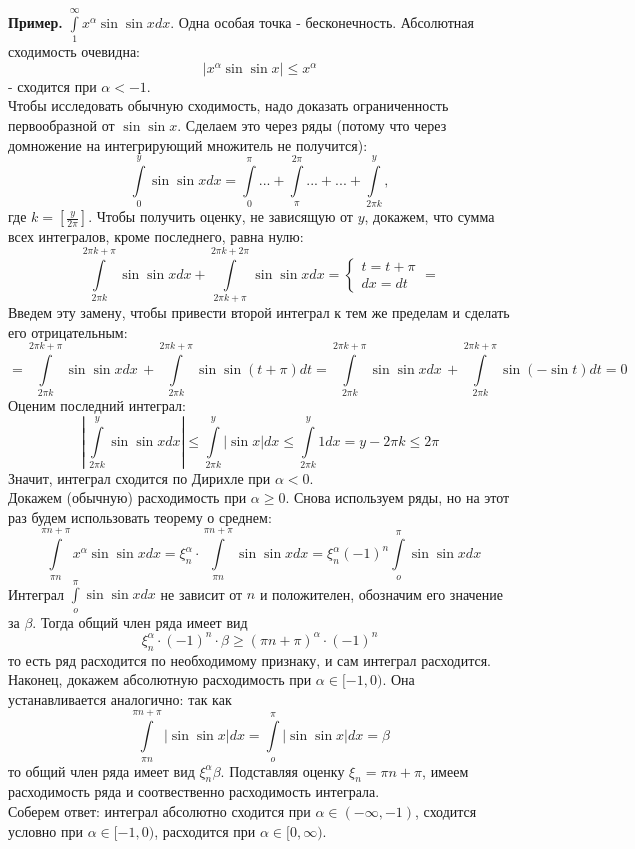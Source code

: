 \textbf{Пример.} $\int\limits_{1}^{\infty}x^\alpha\sin\sin xdx$. Одна особая
точка - бесконечность. Абсолютная сходимость очевидна:
$$|x^\alpha\sin\sin x|\leqslant x^\alpha$$
- сходится при $\alpha<-1$.\\
Чтобы исследовать обычную сходимость, надо доказать ограниченность 
первообразной от $\sin\sin x$. Сделаем это через ряды (потому что через
домножение на интегрирующий множитель не получится):
$$\int\limits_{0}^{y} \sin\sin x dx=\int\limits_{0}^{\pi}...+
\int\limits_{\pi}^{2\pi}...+...+\int\limits_{2\pi k}^{y},$$ 
где $k=\left[ \frac{y}{2\pi} \right]$. Чтобы получить оценку, не зависящую 
от $y$, докажем, что сумма всех интегралов, кроме последнего, равна нулю:
$$\int\limits_{2\pi k}^{2\pi k+\pi}\sin\sin xdx+
\int\limits_{2\pi k+\pi}^{2\pi k+2\pi}\sin\sin xdx=
\begin{cases}t=t+\pi\\dx=dt\end{cases}=$$
Введем эту замену, чтобы привести второй интеграл к тем же пределам и 
сделать его отрицательным:
$$=\int\limits_{2\pi k}^{2\pi k+\pi}\sin\sin xdx\,+
\int\limits_{2\pi k}^{2\pi k+\pi}\sin\sin (t+\pi)dt=
\int\limits_{2\pi k}^{2\pi k+\pi}\sin\sin xdx\,+
\int\limits_{2\pi k}^{2\pi k+\pi}\sin(-\sin t) dt=0$$
Оценим последний интеграл:
$$\left|\,\int\limits_{2\pi k}^{y}\sin\sin xdx\right| \leqslant 
\int\limits_{2\pi k}^{y}|\sin x|dx\leqslant \int\limits_{2\pi k}^{y}1dx=
y-2\pi k\leqslant 2\pi$$
Значит, интеграл сходится по Дирихле при $\alpha<0$.\\
Докажем (обычную) расходимость при $\alpha\geqslant 0$. 
Снова используем ряды, но на 
этот раз будем использовать теорему о среднем:
$$\int\limits_{\pi n}^{\pi n+\pi}x^\alpha\sin\sin xdx=\xi^\alpha_n\cdot 
\int\limits_{\pi n}^{\pi n+\pi}\sin\sin xdx=\xi^\alpha_n(-1)^n
 \int\limits_{o}^{\pi}\sin\sin xdx$$
Интеграл $\int\limits_{o}^{\pi}\sin\sin xdx$ не зависит от  $n$ и положителен, 
обозначим его значение за  $\beta$. Тогда общий член ряда имеет вид
$$\xi^\alpha_n\cdot (-1)^n\cdot\beta\geqslant (\pi n+\pi)^\alpha\cdot(-1)^n$$
то есть ряд расходится по необходимому признаку, и сам интеграл расходится.\\
Наконец, докажем абсолютную расходимость при $\alpha\in[-1,0)$. Она 
устанавливается аналогично: так как
$$\int\limits_{\pi n}^{\pi n+\pi}|\sin\sin x|dx=
 \int\limits_{o}^{\pi}|\sin\sin x|dx=\beta$$
 то общий член ряда имеет вид $\xi^\alpha_n\beta$. Подставляя оценку
 $\xi_n=\pi n+\pi$, имеем расходимость ряда и соотвественно расходимость 
 интеграла.\\
Соберем ответ: интеграл абсолютно сходится при $\alpha\in (-\infty,-1)$,
сходится условно при $\alpha\in [-1,0)$, расходится при 
$\alpha\in [0,\infty)$. 
